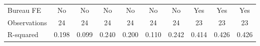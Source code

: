 {\begin{tabular}{l*{9}{c}}
Bureau FE   &          No         &          No         &          No         &          No         &          No         &          No         &         Yes         &         Yes         &         Yes         \\
Observations&          24         &          24         &          24         &          24         &          24         &          24         &          23         &          23         &          23         \\
R-squared   &       0.198         &       0.099         &       0.240         &       0.200         &       0.110         &       0.242         &       0.414         &       0.426         &       0.426         \\
\bottomrule
\end{tabular}
}
